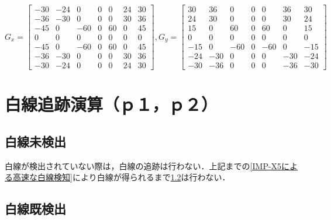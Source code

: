 \documentclass{jsarticle}
\begin{document}
\[
G_x=
\begin{bmatrix}
-30 & -24 & 0 & 0 & 0 & 24 & 30 \\
-36 & -30 & 0 & 0 & 0 & 30 & 36 \\
-45 & 0 & -60 & 0 & 60 & 0 & 45 \\
0 & 0 & 0 & 0 & 0 & 0 & 0 \\
-45 & 0 & -60 & 0 & 60 & 0 & 45 \\
-36 & -30 & 0 & 0 & 0 & 30 & 36 \\
-30 & -24 & 0 & 0 & 0 & 24 & 30
\end{bmatrix},
G_y=
\begin{bmatrix}
30 & 36 & 0 & 0 & 0 & 36 & 30 \\
24 & 30 & 0 & 0 & 0 & 30 & 24 \\
15 & 0 & 60 & 0 & 60 & 0 & 15 \\
0 & 0 & 0 & 0 & 0 & 0 & 0 \\
-15 & 0 & -60 & 0 & -60 & 0 & -15 \\
-24 & -30 & 0 & 0 & 0 & -30 & -24 \\
-30 & -36 & 0 & 0 & 0 & -36 & -30
\end{bmatrix}
\]

\section{白線追跡演算（ｐ１，ｐ２）}
\label{白線追跡演算（ｐ１，ｐ２）}

\subsection{白線未検出}
\label{白線未検出}

白線が検出されていない際は，白線の追跡は行わない．上記までの\ref{IMP-X5による高速な白線検知}により白線が得られるまで\ref{白線既検出}は行わない．

\subsection{白線既検出}
\label{白線既検出}
\end{document}
